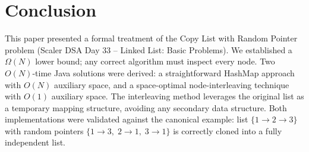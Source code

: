 \documentclass[10pt,journal,compsoc]{IEEEtran}
\begin{document}
\section{Conclusion}
This paper presented a formal treatment of the Copy List with Random Pointer problem (Scaler DSA Day 33 -- Linked List: Basic Problems). We established a $\Omega(N)$ lower bound; any correct algorithm must inspect every node. Two $O(N)$-time Java solutions were derived: a straightforward HashMap approach with $O(N)$ auxiliary space, and a space-optimal node-interleaving technique with $O(1)$ auxiliary space. The interleaving method leverages the original list as a temporary mapping structure, avoiding any secondary data structure. Both implementations were validated against the canonical example: list $\{1 \rightarrow 2 \rightarrow 3\}$ with random pointers $\{1\rightarrow 3,\; 2\rightarrow 1,\; 3\rightarrow 1\}$ is correctly cloned into a fully independent list.
\end{document}

